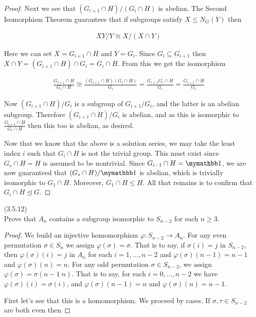 \documentclass{exam}
\begin{document}
\begin{questions}
\begin{proof}
  Next we see that $(G_{i+1}\cap H)/(G_i\cap H)$ is abelian.  The Second Isomorphism Theorem guarantees that if subgroups satisfy $X\leq N_G(Y)$ then

  \begin{align*}
    XY/Y \cong X/(X\cap Y)
  \end{align*}

  Here we can set $X = G_{i+1}\cap H$ and $Y = G_i$.  Since $G_i\subseteq G_{i+1}$ then $X\cap Y = (G_{i+1}\cap H)\cap G_i = G_i\cap H$.  From this we get the isomorphism

  \begin{align*}
    \frac{G_{i+1}\cap H}{G_i\cap H}\cong \frac{(G_{i+1}\cap H)(G_i\cap H)}{G_i} = \frac{G_{i+1}G_i\cap H}{G_i} = \frac{G_{i+1}\cap H}{G_i}
  \end{align*}

  Now $(G_{i+1}\cap H)/G_i$ is a subgroup of $G_{i+1}/G_i$, and the latter is an abelian subgroup.  Therefore $(G_{i+1}\cap H)/G_i$ is abelian, and as this is isomorphic to $\frac{G_{i+1}\cap H}{G_i\cap H}$ then this too is abelian, as desired.

  Now that we know that the above is a solution series, we may take the least index $i$ such that $G_i\cap H$ is not the trivial group.  This must exist since $G_s\cap H = H$ is assumed to be nontrivial.  Since $G_{i-1}\cap H=\mymathbb 1$, we are now guaranteed that $(G_s\cap H)/\mymathbb 1$ is abelian, which is trivially isomorphic to $G_1\cap H$.  Moreover, $G_1\cap H \leq H$. All that remains is to confirm that $G_i\cap H\trianglelefteq G$.


\end{proof}

\question(3.5.12)\\
Prove that $A_n$ contains a subgroup isomorphic to $S_{n-2}$ for each $n\geq 3$.

\begin{proof}
  We build an injective homomorphism $\varphi: S_{n-2}\rightarrow A_n$.  For any even permutation $\sigma\in S_n$ we assign $\varphi(\sigma)=\sigma$.  That is to say, if $\sigma(i)=j$ in $S_{n-2}$, then $\varphi(\sigma)(i)=j$ in $A_n$ for each $i=1,\dots,n-2$ and $\varphi(\sigma)(n-1)=n-1$ and $\varphi(\sigma)(n)=n$.  For any odd permutation $\sigma\in S_{n-2}$, we assign $\varphi(\sigma) = \sigma(n-1\ n)$.  That is to say, for each $i=0,\dots,n-2$ we have $\varphi(\sigma)(i) = \sigma(i)$, and $\varphi(\sigma)(n-1) = n$ and $\varphi(\sigma)(n)=n-1$.

  First let's see that this is a homomorphism.  We proceed by cases.  If $\sigma,\tau\in S_{n-2}$ are both even then


\end{proof}
\end{questions}
\end{document}
